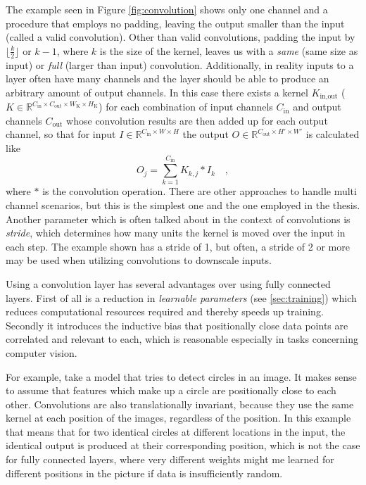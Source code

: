 The example seen in Figure \ref*{fig:convolution} shows only one channel and a procedure that employs no padding, leaving the output smaller than the input (called a valid convolution). Other than valid convolutions, padding the input by $\lfloor\frac{k}{2}\rfloor$ or $k - 1$, where $k$ is the size of the kernel, leaves us with a \emph{same} (same size as input) or \emph{full} (larger than input) convolution. Additionally, in reality inputs to a layer often have many channels and the layer should be able to produce an arbitrary amount of output channels. In this case there exists a kernel $K_{\text{in}, \text{out}}$ ($K\in \mathbb{R}^{C_\text{in}\times C_\text{out}\times W_\text{K} \times H_\text{K}}$) for each combination of input channels $C_\text{in}$ and output channels $C_{\text{out}}$ whose convolution results are then added up for each output channel, so that for input $I\in \mathbb{R}^{C_\text{in}\times W \times H}$ the output $O\in \mathbb{R}^{C_\text{out}\times H' \times W'}$ is calculated like
$$
    O_j = \sum_{k=1}^{C_\text{in}} K_{k,j} * I_k\quad,
$$
where $*$ is the convolution operation. There are other approaches to handle multi channel scenarios, but this is the simplest one and the one employed in the thesis.
Another parameter which is often talked about in the context of convolutions is \emph{stride}, which determines how many units the kernel is moved over the input in each step. The example shown has a stride of 1, but often, a stride of 2 or more may be used when utilizing convolutions to downscale inputs.

Using a convolution layer has several advantages over using fully connected layers. First of all is a reduction in \emph{learnable parameters} (see \ref*{sec:training}) which reduces computational resources required and thereby speeds up training. Secondly it introduces the inductive bias that positionally close data points are correlated and relevant to each, which is reasonable especially in tasks concerning computer vision. 

For example, take a model that tries to detect circles in an image. It makes sense to assume that features which make up a circle are positionally close to each other. Convolutions are also translationally invariant, because they use the same kernel at each position of the images, regardless of the position. 
In this example that means that for two identical circles at different locations in the input, the identical output is produced at their corresponding position, which is not the case for fully connected layers, where very different weights might me learned for different positions in the picture if data is insufficiently random.

